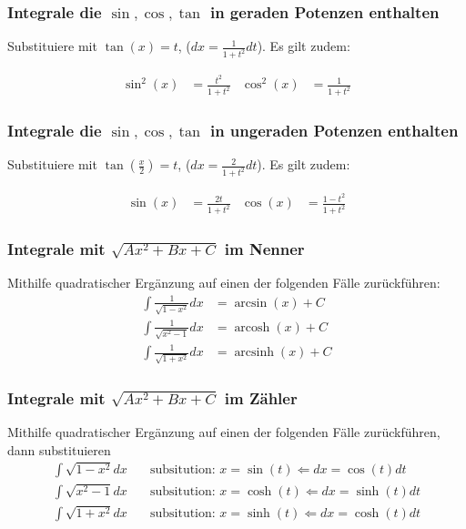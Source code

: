 \documentclass[25pt]{sciposter}
\begin{document}
\begin{multicols}{3}
\subsubsection*{Integrale die $\sin, \cos, \tan$ in geraden Potenzen enthalten}
Substituiere mit $\tan(x) = t$, ($dx = \frac{1}{1+t^2} dt$). Es gilt zudem:

\begin{align*}
\sin^2(x) &= \frac{t^2}{1+t^2} & \cos^2(x) &= \frac{1}{1+t^2}
\end{align*}

\subsubsection*{Integrale die $\sin, \cos, \tan$ in ungeraden Potenzen enthalten}
Substituiere mit $\tan(\frac{x}{2}) = t$, ($dx = \frac{2}{1+t^2} dt$). Es gilt zudem:

\begin{align*}
\sin(x) &= \frac{2t}{1+t^2} & \cos(x) &= \frac{1-t^2}{1+t^2}
\end{align*}



\subsubsection*{Integrale mit $\sqrt{Ax^2 + Bx + C}$ im Nenner}
Mithilfe quadratischer Ergänzung auf einen der folgenden Fälle zurückführen:
\begin{align*}
\int \frac{1}{\sqrt{1-x^2}} dx &= \arcsin(x) + C\\
\int \frac{1}{\sqrt{x^2-1}} dx &= \operatorname{arcosh}(x) + C\\
\int \frac{1}{\sqrt{1+x^2}} dx &= \operatorname{arcsinh}(x) + C
\end{align*}




\subsubsection*{Integrale mit $\sqrt{Ax^2 + Bx + C}$ im Zähler}
Mithilfe quadratischer Ergänzung auf einen der folgenden Fälle zurückführen, dann substituieren
\begin{align*}
\int {\sqrt{1-x^2}} dx \quad &\text{subsitution: } x = \sin(t) \Leftarrow dx = \cos(t) dt\\
\int {\sqrt{x^2-1}} dx \quad &\text{subsitution: } x = \cosh(t) \Leftarrow dx = \sinh(t) dt \\
\int {\sqrt{1+x^2}} dx \quad &\text{subsitution: } x = \sinh(t) \Leftarrow dx = \cosh(t) dt
\end{align*}



\end{multicols}
\end{document}
